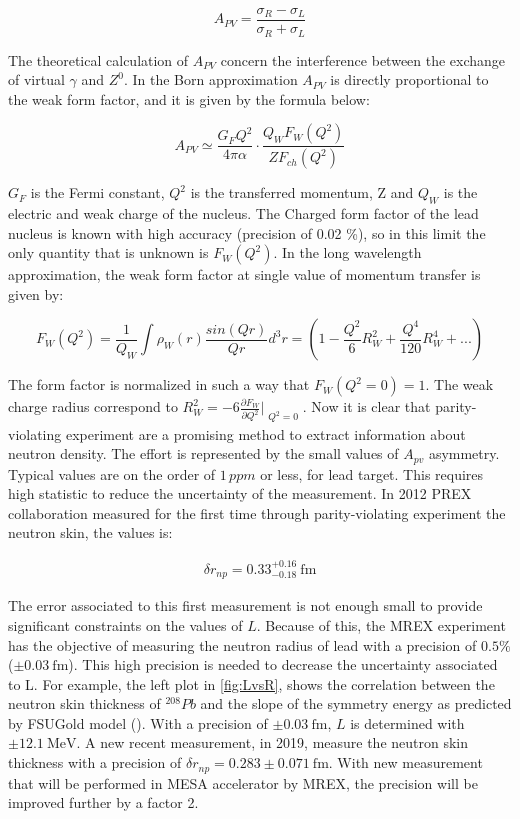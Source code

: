 \begin{equation}
A_{PV} = \dfrac{\sigma_{R} - \sigma_{L}}{\sigma_{R} + \sigma_{L}}
\end{equation} 

The theoretical calculation of $A_{PV}$ concern the interference between the exchange of virtual $\gamma$ and $Z^{0}$. In the Born approximation $A_{PV}$ is directly proportional to the weak form factor, and it is given by the formula below:

\begin{equation}
A_{PV} \simeq \dfrac{G_{F} Q^{2}}{4 \pi \alpha} \cdot \dfrac{Q_{W} F_{W}(Q^{2})}{Z F_{ch}(Q^{2})}
\end{equation} 

$G_{F}$ is the Fermi constant, $Q^{2}$ is the transferred momentum, Z and $Q_{W}$ is the electric and weak charge of the nucleus. The Charged form factor of the lead nucleus is known with high accuracy (precision of 0.02 \%), so in this limit the only quantity that is unknown is $F_{W}(Q^{2})$. In the long wavelength approximation, the weak form factor at single value of momentum transfer is given by:

\begin{equation}
F_{W}(Q^{2}) = \frac{1}{Q_{W}} \int \rho_{W}(r) \dfrac{sin(Qr)}{Qr} d^{3}r = (1 - \frac{Q^{2}}{6} R^{2}_{W} + \frac{Q^{4}}{120}R^{4}_{W} + ...)  
\end{equation}

The form factor is normalized in such a way that $F_{W}(Q^{2} = 0) = 1$. The weak charge radius correspond to $R^{2}_{W} = -6 \frac{\partial F_{W}}{\partial Q^{2}}\Bigr|_{\substack{Q^{2} = 0}}$. Now it is clear that parity-violating experiment are a promising method to extract information about neutron density. The effort is represented by the small values of $A_{pv}$ asymmetry. Typical values are on the order of $1 \, ppm$ or less, for lead target. This requires high statistic to reduce the uncertainty of the measurement. 
In 2012 PREX collaboration measured for the first time through parity-violating experiment the neutron skin, the values is:

\begin{align*}
\delta r_{np} = 0.33^{+0.16}_{-0.18} \SI{}{\femto \meter}
\end{align*}

The error associated to this first measurement is not enough small to provide significant constraints on the values of $L$. Because of this, the MREX experiment has the objective of measuring the neutron radius of lead with a precision of $0.5 \%$  ($\pm \SI{0.03}{\femto \meter}$). This high precision is needed to decrease the uncertainty associated to L. For example, the left plot in \ref{fig:LvsR}, shows the correlation between the neutron skin thickness of $^{208}Pb$ and the slope of the symmetry energy as predicted by FSUGold model (\cite{Fattoyev_2011}). With a precision of $\pm \SI{0.03}{\femto \meter}$, $L$ is determined with $\pm \SI{12.1}{\mega \electronvolt}$. A new recent measurement, in 2019, measure the neutron skin thickness with a precision of 
$\delta r_{np} = 0.283 \pm 0.071 \SI{}{\femto \meter}$. With new measurement that will be performed in MESA accelerator by MREX, the precision will be improved further by a factor 2.

